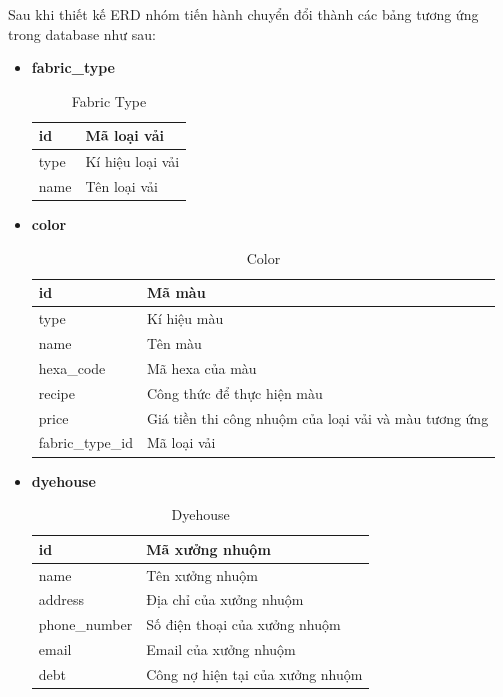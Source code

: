 \newpage
Sau khi thiết kế ERD nhóm tiến hành chuyển đổi thành các bảng tương ứng trong database như sau:
\begin{itemize}
    \item \textbf{fabric\_type}
    \begin{table}[H]
        \centering
        \begin{tabular}{|m{3cm}|m{10cm}|}
        \hline 
            id & Mã loại vải\\ \hline
            type & Kí hiệu loại vải \\ \hline
            name & Tên loại vải\\
        \hline 
        \end{tabular}
        \caption{Fabric Type}
        \label{fabric_type}
    \end{table}
    
    \item \textbf{color}
    \begin{table}[H]
        \centering
        \begin{tabular}{|m{3cm}|m{10cm}|}
        \hline 
            id & Mã màu\\ \hline
            type & Kí hiệu màu \\ \hline
            name & Tên màu\\ \hline
            hexa\_code & Mã hexa của màu \\ \hline
            recipe & Công thức để thực hiện màu \\ \hline
            price & Giá tiền thi công nhuộm của loại vải và màu tương ứng \\ \hline
            fabric\_type\_id & Mã loại vải \\ 
        \hline 
        \end{tabular}
        \caption{Color}
        \label{color}
    \end{table}
    
    \item \textbf{dyehouse}
    \begin{table}[H]
        \centering
        \begin{tabular}{|m{3cm}|m{10cm}|}
        \hline 
            id & Mã xưởng nhuộm\\ \hline
            name & Tên xưởng nhuộm \\ \hline
            address & Địa chỉ của xưởng nhuộm\\ \hline
            phone\_number & Số điện thoại của xưởng nhuộm \\ \hline
            email & Email của xưởng nhuộm\\ \hline
            debt & Công nợ hiện tại của xưởng nhuộm\\
        \hline 
        \end{tabular}
        \caption{Dyehouse}
        \label{dyehouse}
    \end{table}
    

\end{itemize}
